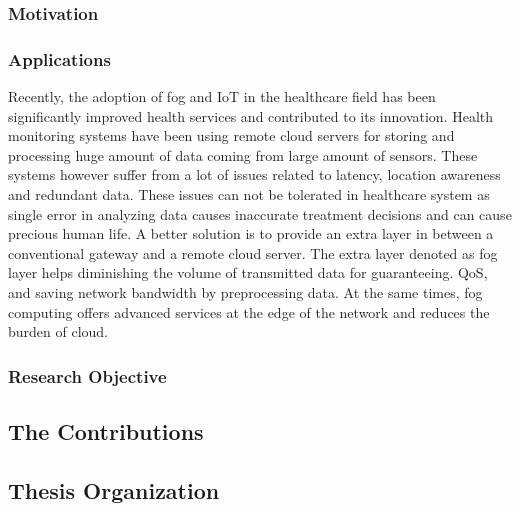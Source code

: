 \documentclass[10pt]{llncs}
\begin{document}
%
\subsubsection{Motivation}


%

%

%

%
\subsubsection{Applications}
Recently, the adoption of fog and IoT in the healthcare field has been significantly improved health services and contributed to its innovation. Health monitoring systems have been using remote cloud servers for storing and processing huge amount of data coming from large amount of sensors. These systems however suffer from a lot of issues related to latency, location awareness and redundant data. These issues can not be tolerated in healthcare system as single error in analyzing data causes inaccurate treatment decisions and can cause precious human life. A better solution is to provide an extra layer in between a conventional gateway and a remote cloud server. The extra layer denoted as fog layer helps diminishing the volume of transmitted data for guaranteeing. QoS, and saving network bandwidth by preprocessing data. At the same times, fog computing offers advanced services at the edge of the network and reduces the burden of cloud.

%
\subsubsection{Research Objective}



%
\subsection{The Contributions}


%
\subsection{Thesis Organization}
\end{document}
